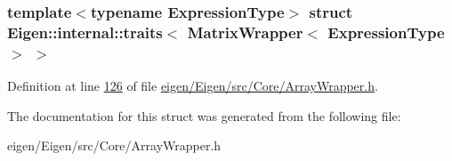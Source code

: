 \subsubsection*{template$<$typename Expression\+Type$>$\newline
struct Eigen\+::internal\+::traits$<$ Matrix\+Wrapper$<$ Expression\+Type $>$ $>$}



Definition at line \hyperlink{eigen_2_eigen_2src_2_core_2_array_wrapper_8h_source_l00126}{126} of file \hyperlink{eigen_2_eigen_2src_2_core_2_array_wrapper_8h_source}{eigen/\+Eigen/src/\+Core/\+Array\+Wrapper.\+h}.



The documentation for this struct was generated from the following file\+:\begin{DoxyCompactItemize}
\item 
eigen/\+Eigen/src/\+Core/\+Array\+Wrapper.\+h\end{DoxyCompactItemize}
